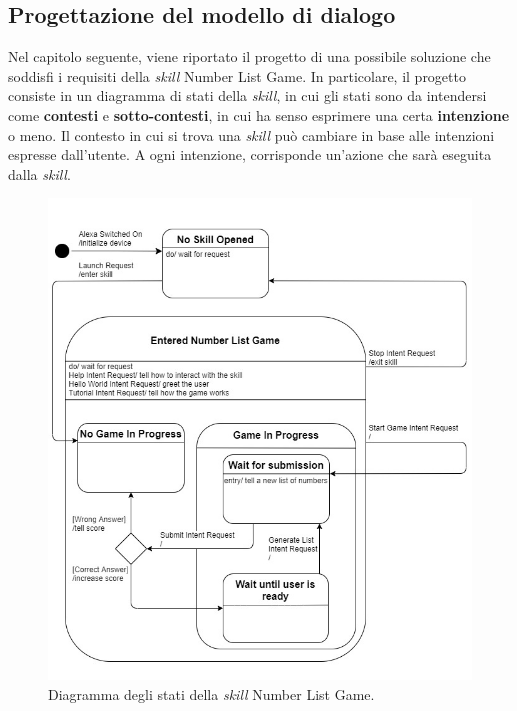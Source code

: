 \subsection{Progettazione del modello di dialogo}
\label{subsec:Sezione4.1.2}

Nel capitolo seguente, viene riportato il progetto di una possibile soluzione
che soddisfi i requisiti della \textit{skill} Number List Game. In particolare,
il progetto consiste in un diagramma di stati della \textit{skill}, in cui gli
stati sono da intendersi come \textbf{contesti} e \textbf{sotto-contesti}, in
cui ha senso esprimere una certa \textbf{intenzione} o meno. Il contesto in cui
si trova una \textit{skill} può cambiare in base alle intenzioni espresse
dall’utente. A ogni intenzione, corrisponde un’azione che sarà eseguita dalla
\textit{skill}.

\begin{figure}[!ht]
  \centering
  \includegraphics[scale=0.56]{resources/images/design/skill-state-diagram/number-list-game-state-diagram.jpg}
  \caption{Diagramma degli stati della \textit{skill} Number List Game.}
  \label{fig:figure4.2}
\end{figure}

